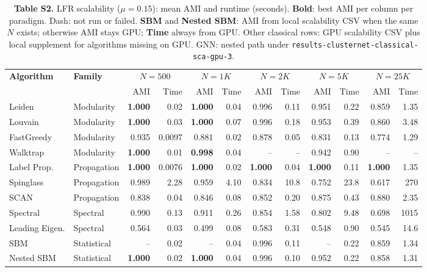 \begin{table}[t]
\centering
\caption{\textbf{Table S2.} LFR scalability ($\mu{=}0.15$): mean AMI and runtime (seconds). \textbf{Bold}: best AMI per column per paradigm. Dash: not run or failed. \textbf{SBM} and \textbf{Nested SBM}: AMI from local scalability CSV when the same $N$ exists; otherwise AMI stays GPU; \textbf{Time} always from GPU. Other classical rows: GPU scalability CSV plus local supplement for algorithms missing on GPU. GNN: nested path under \texttt{results-clusternet-classical-sca-gpu-3}.}
\label{tab:supp_lfr_scalability_full}
\footnotesize
\begin{tabular}{llrrrrrrrrrr}
\toprule
\textbf{Algorithm} & \textbf{Family} & \multicolumn{2}{c}{$N\!=500$} & \multicolumn{2}{c}{$N\!=1K$} & \multicolumn{2}{c}{$N\!=2K$} & \multicolumn{2}{c}{$N\!=5K$} & \multicolumn{2}{c}{$N\!=25K$} \\
 & & AMI & Time & AMI & Time & AMI & Time & AMI & Time & AMI & Time \\
\midrule
Leiden & Modularity & \textbf{1.000} & 0.02 & \textbf{1.000} & 0.04 & 0.996 & 0.11 & 0.951 & 0.22 & 0.859 & 1.35 \\
Louvain & Modularity & \textbf{1.000} & 0.03 & \textbf{1.000} & 0.07 & 0.996 & 0.18 & 0.953 & 0.39 & 0.860 & 3.48 \\
FastGreedy & Modularity & 0.935 & 0.0097 & 0.881 & 0.02 & 0.878 & 0.05 & 0.831 & 0.13 & 0.774 & 1.29 \\
Walktrap & Modularity & \textbf{1.000} & 0.01 & \textbf{0.998} & 0.04 & -- & -- & 0.942 & 0.90 & -- & -- \\
Label Prop. & Propagation & \textbf{1.000} & 0.0076 & \textbf{1.000} & 0.02 & \textbf{1.000} & 0.04 & \textbf{1.000} & 0.11 & \textbf{1.000} & 1.35 \\
Spinglass & Propagation & 0.989 & 2.28 & 0.959 & 4.10 & 0.834 & 10.8 & 0.752 & 23.8 & 0.617 & 270 \\
SCAN & Propagation & 0.838 & 0.04 & 0.846 & 0.08 & 0.852 & 0.20 & 0.875 & 0.43 & 0.880 & 2.35 \\
Spectral & Spectral & 0.990 & 0.13 & 0.911 & 0.26 & 0.854 & 1.58 & 0.802 & 9.48 & 0.698 & 1015 \\
Leading Eigen. & Spectral & 0.564 & 0.03 & 0.499 & 0.08 & 0.583 & 0.31 & 0.548 & 0.90 & 0.545 & 14.6 \\
SBM & Statistical & -- & 0.02 & -- & 0.04 & 0.996 & 0.11 & -- & 0.22 & 0.859 & 1.34 \\
Nested SBM & Statistical & \textbf{1.000} & 0.02 & \textbf{1.000} & 0.04 & 0.996 & 0.10 & 0.952 & 0.22 & 0.858 & 1.31 \\

\end{tabular}
\end{table}
